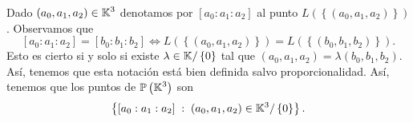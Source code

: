 \begin{observation}
	Dado $\displaystyle \left(a_{0}, a_{1}, a_{2}\right) \in \mathbb{K}^{3} $ denotamos por $\displaystyle \left[a_{0}: a_{1}: a_{2}\right]  $ al punto $\displaystyle L\left( \left\{ \left(a_{0}, a_{1}, a_{2}\right)\right\} \right) $. Observamos que 
	\[ \left[a_{0} : a_{1} : a_{2}\right] = \left[b_{0} : b_{1} : b_{2}\right] \iff L\left( \left\{ \left(a_{0}, a_{1}, a_{2}\right)\right\} \right) = L\left( \left\{ \left(b_{0}, b_{1}, b_{2}\right)\right\} \right).\]
	Esto es cierto si y solo si existe $\displaystyle \lambda \in \mathbb{K}/ \left\{ 0\right\}  $ tal que $\displaystyle \left(a_{0}, a_{1}, a_{2}\right) = \lambda \left(b_{0}, b_{1}, b_{2}\right) $. Así, tenemos que esta notación está bien definida salvo proporcionalidad. Así, tenemos que los puntos de $\displaystyle \mathbb{P}\left(\mathbb{K}^{3}\right) $ son 
	\[ \left\{ \left[a_{0} : a_{1} : a_{2}\right] \; : \; \left(a_{0}, a_{1}, a_{2}\right) \in \mathbb{K}^{3} / \left\{ 0\right\} \right\}  .\]
\end{observation}

